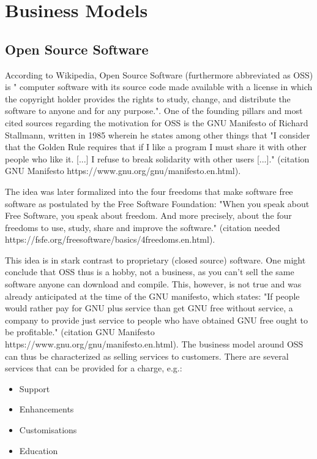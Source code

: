 \documentclass[a4paper]{report}
\begin{document}
\section{Business Models}
\label{sec:BusMods}

\subsection{Open Source Software}
\label{ssec:OSS}
According to Wikipedia, Open Source Software (furthermore abbreviated as OSS) is " computer software with its source code made available with a license in which the copyright holder provides the rights to study, change, and distribute the software to anyone and for any purpose."\parencite{WikiOSS}. One of the founding pillars and most cited sources regarding the motivation for OSS is the GNU Manifesto of Richard Stallmann, written in 1985 wherein he states among other things that "I consider that the Golden Rule requires that if I like a program I must share it with other people who like it. [...] I refuse to break solidarity with other users [...]." (citation GNU Manifesto https://www.gnu.org/gnu/manifesto.en.html).

The idea was later formalized into the four freedoms that make software free software as postulated by the Free Software Foundation: "When you speak about Free Software, you speak about freedom. And more precisely, about the four freedoms to use, study, share and improve the software." (citation needed https://fsfe.org/freesoftware/basics/4freedoms.en.html).

This idea is in stark contrast to proprietary (closed source) software. One might conclude that OSS thus is a hobby, not a business, as you can't sell the same software anyone can download and compile. This, however, is not true and was already anticipated at the time of the GNU manifesto, which states: "If people would rather pay for GNU plus service than get GNU free without service, a company to provide just service to people who have obtained GNU free ought to be profitable." (citation GNU Manifesto https://www.gnu.org/gnu/manifesto.en.html). The business model around OSS can thus be characterized as selling services to customers. There are several services that can be provided for a charge, e.g.:
\begin{itemize}
	\item Support
	\item Enhancements
	\item Customisations
	\item Education 
\end{itemize}
\end{document}
